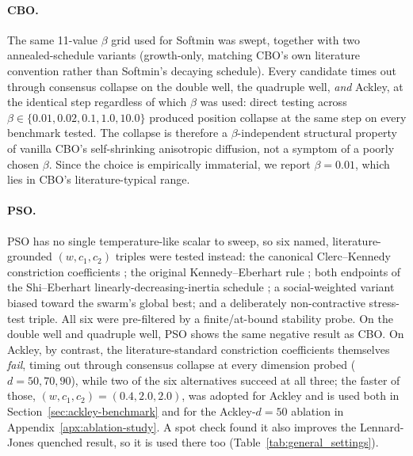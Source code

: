 \documentclass{article}
\theoremstyle{plain}
\theoremstyle{definition}
\theoremstyle{remark}
\begin{document}
\paragraph{CBO.} The same 11-value $\beta$ grid used for Softmin was swept, together with two annealed-schedule variants (growth-only, matching CBO's own literature convention rather than Softmin's decaying schedule). Every candidate times out through consensus collapse on the double well, the quadruple well, \emph{and} Ackley, at the identical step regardless of which $\beta$ was used: direct testing across $\beta\in\{0.01,0.02,0.1,1.0,10.0\}$ produced position collapse at the same step on every benchmark tested. The collapse is therefore a $\beta$-independent structural property of vanilla CBO's self-shrinking anisotropic diffusion, not a symptom of a poorly chosen $\beta$. Since the choice is empirically immaterial, we report $\beta=0.01$, which lies in CBO's literature-typical range.

\paragraph{PSO.} PSO has no single temperature-like scalar to sweep, so six named, literature-grounded $(w,c_1,c_2)$ triples were tested instead: the canonical Clerc--Kennedy constriction coefficients \cite{clerc2002particle}; the original Kennedy--Eberhart rule \cite{kennedy1995particle}; both endpoints of the Shi--Eberhart linearly-decreasing-inertia schedule \cite{shi1998modified}; a social-weighted variant biased toward the swarm's global best; and a deliberately non-contractive stress-test triple. All six were pre-filtered by a finite/at-bound stability probe. On the double well and quadruple well, PSO shows the same negative result as CBO. On Ackley, by contrast, the literature-standard constriction coefficients themselves \emph{fail}, timing out through consensus collapse at every dimension probed ($d=50,70,90$), while two of the six alternatives succeed at all three; the faster of those, $(w,c_1,c_2)=(0.4,2.0,2.0)$, was adopted for Ackley and is used both in Section~\ref{sec:ackley-benchmark} and for the Ackley-$d{=}50$ ablation in Appendix~\ref{apx:ablation-study}. A spot check found it also improves the Lennard-Jones quenched result, so it is used there too (Table~\ref{tab:general_settings}).
\end{document}
